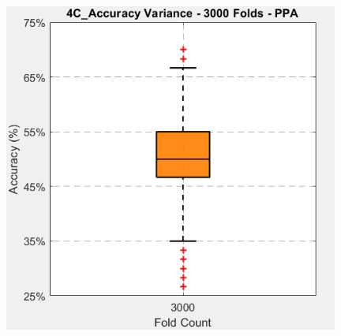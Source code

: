 \begin{frame}
\begin{columns}
		\begin{column}{0.49\textwidth}
			\begin{itemize}
			\end{itemize}
			\begin{figure}
				\centering
				\includegraphics[width=0.98\textwidth]{assets/box_4C_3000_ppa.png}
			\end{figure}
		\end{column}
	\end{columns}
\end{frame}



